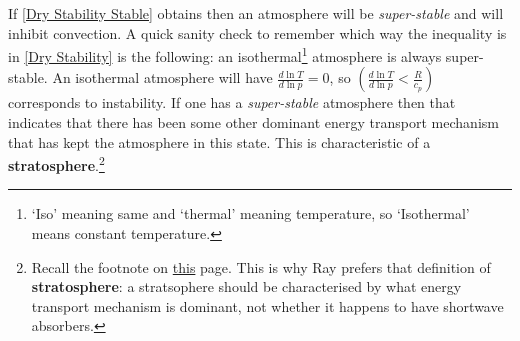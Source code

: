 If \ref{Dry Stability Stable} obtains then an atmosphere will be \textit{super-stable} and will inhibit convection. A quick sanity check to remember which way the inequality is in \ref{Dry Stability} is the following: an isothermal\footnote{
    `Iso' meaning same and `thermal' meaning temperature, so `Isothermal' means constant temperature.
} atmosphere is always super-stable. An isothermal atmosphere will have $\frac{d \ln T}{d \ln p} = 0$, so $\left( \frac{d \ln T}{d \ln p} < \frac{R}{c_p} \right)$ corresponds to instability. If one has a \textit{super-stable} atmosphere then that indicates that there has been some other dominant energy transport mechanism that has kept the atmosphere in this state. This is characteristic of a \textbf{stratosphere}.\footnote{
    Recall the footnote on \hyperref[Vertical Structure]{this} page. This is why Ray prefers that definition of \textbf{stratosphere}: a stratsophere should be characterised by what energy transport mechanism is dominant, not whether it happens to have shortwave absorbers.
} 

